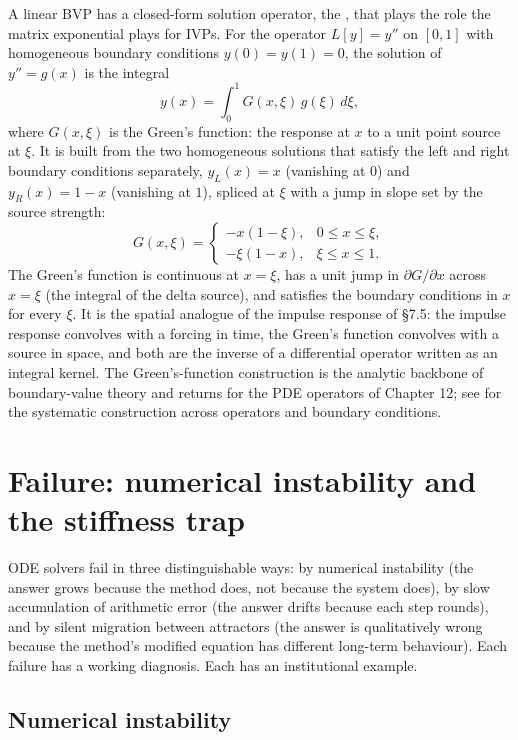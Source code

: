 \begin{mastery}
A linear BVP has a closed-form solution operator, the
, that plays the role the matrix exponential
plays for IVPs. For the operator $L[y] = y''$ on $[0, 1]$ with
homogeneous boundary conditions $y(0) = y(1) = 0$, the solution of
$y'' = g(x)$ is the integral
\[
y(x) = \int_{0}^{1} G(x, \xi)\, g(\xi)\, d\xi,
\]
where $G(x, \xi)$ is the Green's function: the response at $x$ to a
unit point source at $\xi$. It is built from the two homogeneous
solutions that satisfy the left and right boundary conditions
separately, $y_{L}(x) = x$ (vanishing at $0$) and $y_{R}(x) = 1 - x$
(vanishing at $1$), spliced at $\xi$ with a jump in slope set by the
source strength:
\[
G(x, \xi) = \begin{cases} -x(1 - \xi), & 0 \leq x \leq \xi, \\
-\xi(1 - x), & \xi \leq x \leq 1. \end{cases}
\]
The Green's function is continuous at $x = \xi$, has a unit jump in
$\partial G/\partial x$ across $x = \xi$ (the integral of the delta
source), and satisfies the boundary conditions in $x$ for every
$\xi$. It is the spatial analogue of the impulse response of \S7.5:
the impulse response convolves with a forcing in time, the Green's
function convolves with a source in space, and both are the inverse
of a differential operator written as an integral kernel. The
Green's-function construction is the analytic backbone of
boundary-value theory and returns for the PDE operators of Chapter
12; see \textcite{text:boyce-diprima} for the systematic
construction across operators and boundary conditions.
\end{mastery}

\section{Failure: numerical instability and the stiffness trap}

ODE solvers fail in three distinguishable ways: by numerical
instability (the answer grows because the method does, not because
the system does), by slow accumulation of arithmetic error (the
answer drifts because each step rounds), and by silent migration
between attractors (the answer is qualitatively wrong because the
method's modified equation has different long-term behaviour).
Each failure has a working diagnosis. Each has an institutional
example.

\subsection{Numerical instability}

